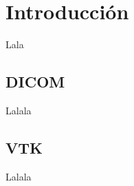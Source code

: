 \chapter{Introducción}
Lala

\section{DICOM}
Lalala \cite{dicom_classes_vtk}

\section{VTK}
Lalala \cite{intro_medical_vtk_bioimage}
